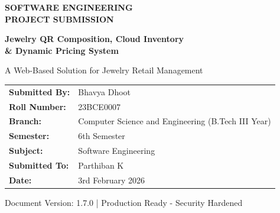 \documentclass[12pt,a4paper]{article}
\begin{document}
\begin{titlepage}
    \centering
    \vspace*{1cm}
    
    {\Huge\bfseries SOFTWARE ENGINEERING\\[0.3cm]PROJECT SUBMISSION\par}
    
    \vspace{1.5cm}
    
    {\LARGE\bfseries Jewelry QR Composition, Cloud Inventory\\& Dynamic Pricing System\par}
    
    \vspace{0.5cm}
    
    {\large A Web-Based Solution for Jewelry Retail Management\par}
    
    \vspace{2cm}
    
    \begin{tabular}{ll}
        \textbf{Submitted By:} & Bhavya Dhoot \\[0.3cm]
        \textbf{Roll Number:} & 23BCE0007 \\[0.3cm]
        \textbf{Branch:} & Computer Science and Engineering (B.Tech III Year) \\[0.3cm]
        \textbf{Semester:} & 6th Semester \\[0.3cm]
        \textbf{Subject:} & Software Engineering \\[0.3cm]
        \textbf{Submitted To:} & Parthiban K \\[0.3cm]
        \textbf{Date:} & 3rd February 2026
    \end{tabular}
    
    \vfill
    
    {\small Document Version: 1.7.0 | Production Ready - Security Hardened\par}
\end{titlepage}

\newpage
\tableofcontents
\newpage

\end{document}
